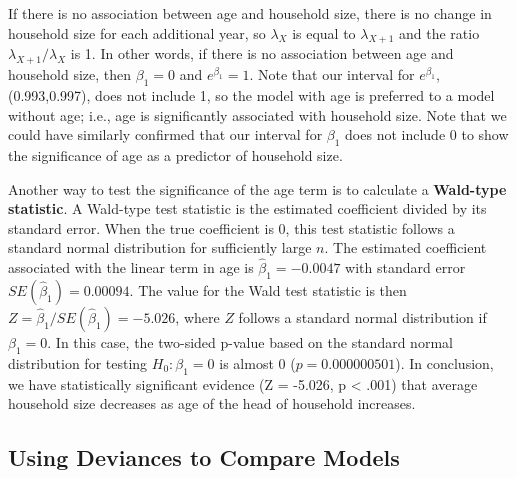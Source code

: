 \documentclass[
]{krantz}
\begin{document}
If there is no association between age and household size, there is no change in household size for each additional year, so \(\lambda_X\) is equal to \(\lambda_{X+1}\) and the ratio \(\lambda_{X+1}/\lambda_X\) is 1. In other words, if there is no association between age and household size, then \(\beta_1=0\) and \(e^{\beta_1}=1\). Note that our interval for \(e^{\beta_1}\), (0.993,0.997), does not include 1, so the model with age is preferred to a model without age; i.e., age is significantly associated with household size. Note that we could have similarly confirmed that our interval for \(\beta_1\) does not include 0 to show the significance of age as a predictor of household size.

Another way to test the significance of the age term is to calculate a \textbf{Wald-type statistic}. A Wald-type test statistic is the estimated coefficient divided by its standard error. When the true coefficient is 0, this test statistic follows a standard normal distribution for sufficiently large \(n\). The estimated coefficient associated with the linear term in age is \({\hat{\beta}_1}=-0.0047\) with standard error \(SE(\hat{\beta}_1)=0.00094\). The value for the Wald test statistic is then \(Z=\hat{\beta}_1/SE(\hat{\beta}_1)=-5.026\), where \(Z\) follows a standard normal distribution if \(\beta_1=0\). In this case, the two-sided p-value based on the standard normal distribution for testing \(H_0:\beta_1=0\) is almost 0 (\(p=0.000000501\)). In conclusion, we have statistically significant evidence (Z = -5.026, p \textless{} .001) that average household size decreases as age of the head of household increases.

\hypertarget{sec-Devtocompare}{%
\subsection{Using Deviances to Compare Models}\label{sec-Devtocompare}}
\end{document}
